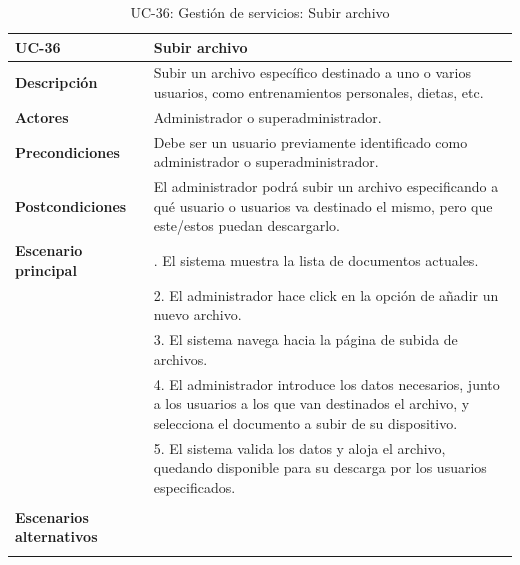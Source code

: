 \begin{table}
  \begin{center}
    \begin{tabularx}{16.4cm}{|l|X|}
      \hline
      \textbf{UC-36} & \textbf{Subir archivo}\\
      \hline
      \textbf{Descripción} & Subir un archivo específico destinado a uno o varios usuarios, como entrenamientos personales, dietas, etc. \\
      \hline
      \textbf{Actores} & Administrador o superadministrador.\\
      \hline
      \textbf{Precondiciones} & Debe ser un usuario previamente identificado como administrador o superadministrador.\\
      \hline
      \textbf{Postcondiciones} & El administrador podrá subir un archivo especificando a qué usuario o usuarios va destinado el mismo, pero que este/estos puedan descargarlo.\\
      \hline
      \textbf{Escenario principal} & \smallskip 1. El sistema muestra la lista de documentos actuales.\\
      & 2. El administrador hace click en la opción de añadir un nuevo archivo.\\
      & 3. El sistema navega hacia la página de subida de archivos.\\
      & 4. El administrador introduce los datos necesarios, junto a los usuarios a los que van destinados el archivo, y selecciona el documento a subir de su dispositivo.\\
      & 5. El sistema valida los datos y aloja el archivo, quedando disponible para su descarga por los usuarios especificados.\\
      & \\
      \hline
      \textbf{Escenarios alternativos} & \\
      & \\
      \hline
    \end{tabularx}
    \caption{UC-36: Gestión de servicios: Subir archivo}
    \label{tab:CU-subir-archivo}
  \end{center}
\end{table}


